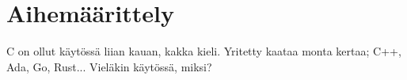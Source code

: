 \section{Aihemäärittely}
\label{sec:aihemaarittely}

C on ollut käytössä liian kauan, kakka kieli. Yritetty kaataa monta kertaa; C++, Ada, Go, Rust...
Vieläkin käytössä, miksi?
